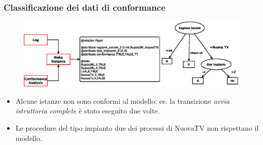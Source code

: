 
\begin{frame}
	\frametitle{Classificazione dei dati di conformance}
	\begin{figure}
	\includegraphics[scale=0.6]{./fig/animazioneconf/decisiontree1}
	\end{figure}
	\begin{block}{}
	\begin{itemize}
	\item Alcune istanze non sono conformi al modello: es. la transizione \textit{avvia istruttoria complete} \`{e} stato eseguito due volte.
	\item Le procedure del tipo impianto due dei processi di NuovaTV non rispettano il modello.
	\end{itemize}
	\end{block}
	\end{frame}
	
	